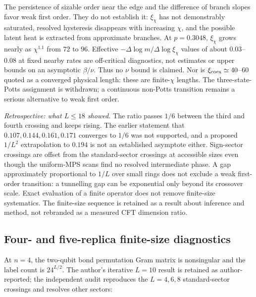 The persistence of sizable order near the edge and the difference of branch slopes favor weak first order. They do not establish it: $\xi_\chi$ has not demonstrably saturated, resolved hysteresis disappears with increasing $\chi$, and the possible latent heat is extracted from approximate branches. At $p=0.3048$, $\xi_\chi$ grows nearly as $\chi^{1.1}$ from $72$ to $96$. Effective $-\Delta\log m/\Delta\log\xi_\chi$ values of about $0.03$--$0.08$ at fixed nearby rates are off-critical diagnostics, not estimates or upper bounds on an asymptotic $\beta/\nu$. Thus no $\nu$ bound is claimed. Nor is $\xi_{\rm coex}\simeq40$--$60$ quoted as a converged physical length: these are finite-$\chi$ lengths. The three-state-Potts assignment is withdrawn; a continuous non-Potts transition remains a serious alternative to weak first order.

\emph{Retrospective: what $L\le18$ showed.} The ratio passes $1/6$ between the third and fourth crossing and keeps rising. The earlier statement that $0.107,0.144,0.161,0.171$ converges to $1/6$ was not supported, and a proposed $1/L^2$ extrapolation to $0.194$ is not an established asymptote either. Sign-sector crossings are offset from the standard-sector crossings at accessible sizes even though the uniform-MPS scans find no resolved intermediate phase. A gap approximately proportional to $1/L$ over small rings does not exclude a weak first-order transition: a tunnelling gap can be exponential only beyond its crossover scale. Exact evaluation of a finite operator does not remove finite-size systematics. The finite-size sequence is retained as a result about inference and method, not rebranded as a measured CFT dimension ratio.

\subsection{Four- and five-replica finite-size diagnostics}
\label{sec:n4n5}

At $n=4$, the two-qubit bond permutation Gram matrix is nonsingular and the label count is $24^{L/2}$. The author's iterative $L=10$ result is retained as author-reported; the independent audit reproduces the $L=4,6,8$ standard-sector crossings and resolves other sectors:

